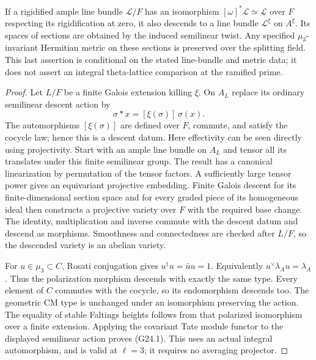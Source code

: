 \begin{proposition}
If a rigidified ample line bundle $\mathcal L/F$ has an
isomorphism $[\omega]^*\mathcal L\simeq\mathcal L$ over $F$
respecting its rigidification at zero, it also descends to a line
bundle $\mathcal L^\xi$ on $A^\xi$.  Its spaces of sections are
obtained by the induced semilinear twist.  Any specified
$\mu_3$-invariant Hermitian metric on these sections is preserved
over the splitting field.  This last assertion is conditional on
the stated line-bundle and metric data; it does not assert an
integral theta-lattice comparison at the ramified prime.
\end{proposition}
\begin{proof}
Let $L/F$ be a finite Galois extension killing $\xi$.
On $A_L$ replace its ordinary semilinear descent action by
\[
             \sigma*x=[\xi(\sigma)]\,\sigma(x).
\]
The automorphisms $[\xi(\sigma)]$ are defined over $F$,
commute, and satisfy the cocycle law; hence this is a descent datum.
Here effectivity can be seen directly using projectivity.  Start
with an ample line bundle on $A_L$ and tensor all its translates
under this finite semilinear group.  The result has a canonical
linearization by permutation of the tensor factors.  A sufficiently
large tensor power gives an equivariant projective embedding.
Finite Galois descent for its finite-dimensional section space and
for every graded piece of its homogeneous ideal then constructs a
projective variety over $F$ with the required base change.  The
identity, multiplication and inverse commute with the descent datum
and descend as morphisms.  Smoothness and connectedness are checked
after $L/F$, so the descended variety is an abelian variety.

For $u\in\mu_3\subset C$, Rosati conjugation gives
$u^\dagger u=\bar u u=1$.  Equivalently
$u^\vee\lambda_Au=\lambda_A$.  Thus the polarization morphism
descends with exactly the same type.  Every element of $C$ commutes
with the cocycle, so its endomorphism descends too.  The geometric
CM type is unchanged under an isomorphism preserving the action.
The equality of stable Faltings heights follows from that polarized
isomorphism over a finite extension.  Applying the covariant Tate
module functor to the displayed semilinear action proves (G24.1).
This uses an actual integral automorphism, and is valid at $\ell=3$;
it requires no averaging projector.


\end{proof}
